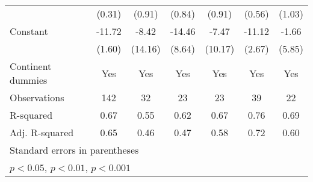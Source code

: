 {\begin{tabular}{l*{6}{c}}
                    &      (0.31)         &      (0.91)         &      (0.84)         &      (0.91)         &      (0.56)         &      (1.03)         \\
\addlinespace
Constant            &      -11.72\sym{***}&       -8.42         &      -14.46         &       -7.47         &      -11.12\sym{***}&       -1.66         \\
                    &      (1.60)         &     (14.16)         &      (8.64)         &     (10.17)         &      (2.67)         &      (5.85)         \\
\addlinespace
Continent dummies   &         Yes         &         Yes         &         Yes         &         Yes         &         Yes         &         Yes         \\
\midrule
Observations        &         142         &          32         &          23         &          23         &          39         &          22         \\
R-squared           &        0.67         &        0.55         &        0.62         &        0.67         &        0.76         &        0.69         \\
Adj. R-squared      &        0.65         &        0.46         &        0.47         &        0.58         &        0.72         &        0.60         \\
\bottomrule
\multicolumn{7}{l}{\footnotesize Standard errors in parentheses}\\
\multicolumn{7}{l}{\footnotesize \sym{*} \(p<0.05\), \sym{**} \(p<0.01\), \sym{***} \(p<0.001\)}\\
\end{tabular}
}
